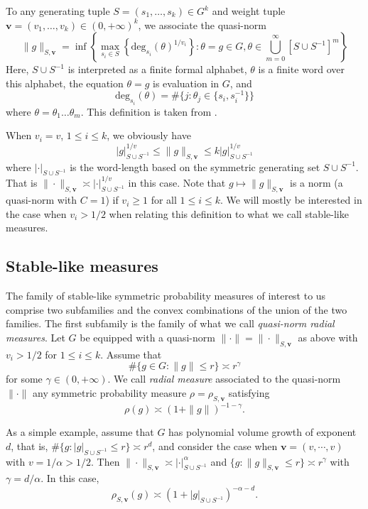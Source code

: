 \documentclass[pdflatex,sn-mathphys-num]{sn-jnl}%
\theoremstyle{thmstyleone}%
\theoremstyle{thmstyletwo}%
\theoremstyle{thmstylethree}%
\begin{document}
 To any generating tuple $S=(s_1,\dots,s_k)\in G^k$ and weight tuple $\mathbf v=(v_1,\dots,v_k)\in (0,+\infty)^k$, we associate the quasi-norm
 \begin{equation}\label{QN}
     \|g\|_{S,\mathbf v}= \inf \left\{ \max_{s_i \in S}\left\{ \mbox{deg}_{s_i}(\theta)^{1/v_i} \right\}:  \theta = g \in G, \theta \in \bigcup_{m=0}^\infty [S\cup S^{-1}]^m\right\} \end{equation}
Here, $S\cup S^{-1}$ is interpreted as a finite formal alphabet, $\theta$ is a finite word over this alphabet, the equation $\theta=g$ is evaluation in $G$, and 
$$\mbox{deg}_{s_i}(\theta)=\#\{j: \theta_j\in \{s_i,s_i^{-1}\}\}$$ where $\theta=\theta_1\dots \theta_m.$ This definition is taken from \cite{SCZ-nil}. 

When $v_i=v$, $1\le i\le k$, we obviously have $$|g|^{1/v}_{S\cup S^{-1}}\le \|g\|_{S,\mathbf v}\le k|g|^{1/v}_{S\cup S^{-1}}$$ where $|\cdot|_{S\cup S^{-1}}$ is the word-length based on the symmetric generating set $S\cup S^{-1}$. That is $\|\cdot\|_{S,\mathbf v}\asymp |\cdot|^{1/v}_{S\cup S^{-1}}$ in this case. Note that $g\mapsto \|g\|_{S,\mathbf v}$
is a norm (a quasi-norm with $C=1$) if $v_i\ge 1$ for all $1\le i\le k$. We will mostly be interested in the case when $v_i>1/2$ when relating this definition to what we call stable-like measures.


\subsection{Stable-like measures}
 The family of stable-like symmetric probability measures of interest to us comprise two subfamilies and the convex combinations  of the union of the two families.  The first subfamily is the family of what we call {\em quasi-norm radial measures}. Let $G$ be equipped with a quasi-norm $\|\cdot\|=\|\cdot\|_{S,\mathbf v}$ as above with $v_i>1/2$ for $1\le i\le k$. Assume that
$$\#\{g\in G: \|g\|\le r\}\asymp r^\gamma$$ 
for some $\gamma\in (0,+\infty)$. We call {\em radial measure} associated to the quasi-norm $\|\cdot\|$ any symmetric probability measure $\rho=\rho_{S,\mathbf v}$  satisfying
 \begin{equation}\label{radial} \rho(g)\asymp (1+\|g\|)^{-1-\gamma}.
\end{equation}


As a simple example, assume that $G$ has polynomial volume growth of exponent $d$, that is,
$\#\{g:|g|_{S\cup S^{-1}}\le r\}\asymp r^d$, and consider the case when $\mathbf v=(v,\cdots,v)$ with $v=1/\alpha>1/2$. Then
$\|\cdot \|_{S,\mathbf v}\asymp |\cdot |^\alpha_{S\cup S^{-1}}$ and $\{g: \|g\|_{S,\mathbf v}\le r\}\asymp r^{\gamma}$ with $\gamma=d/\alpha$. In this case,
$$\rho_{S,\mathbf v}(g)\asymp (1+|g|_{S\cup S^{-1}})^{-\alpha-d}.$$
\end{document}
